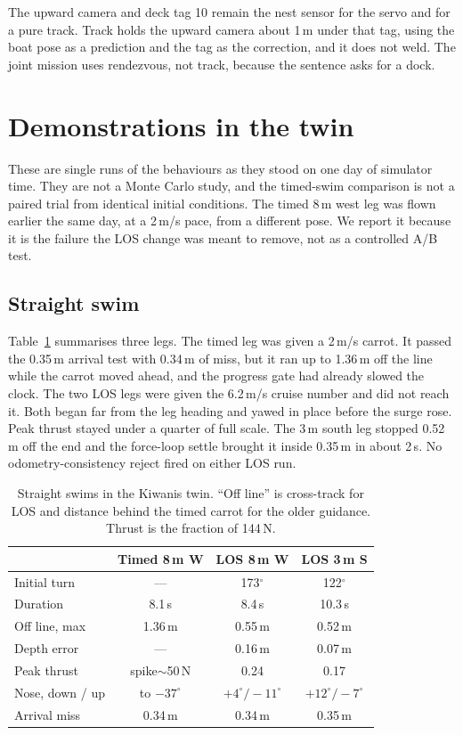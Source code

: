 \documentclass[conference]{IEEEtran}
\begin{document}
The upward camera and deck tag 10 remain the nest sensor for the servo and for a pure track. Track holds the upward camera about 1\,m under that tag, using the boat pose as a prediction and the tag as the correction, and it does not weld. The joint mission uses rendezvous, not track, because the sentence asks for a dock.

\section{Demonstrations in the twin}
\label{sec:results}

These are single runs of the behaviours as they stood on one day of simulator time. They are not a Monte Carlo study, and the timed-swim comparison is not a paired trial from identical initial conditions. The timed 8\,m west leg was flown earlier the same day, at a 2\,m/s pace, from a different pose. We report it because it is the failure the LOS change was meant to remove, not as a controlled A/B test.

\subsection{Straight swim}
Table~\ref{tab:swim} summarises three legs. The timed leg was given a 2\,m/s carrot. It passed the 0.35\,m arrival test with 0.34\,m of miss, but it ran up to 1.36\,m off the line while the carrot moved ahead, and the progress gate had already slowed the clock. The two LOS legs were given the 6.2\,m/s cruise number and did not reach it. Both began far from the leg heading and yawed in place before the surge rose. Peak thrust stayed under a quarter of full scale. The 3\,m south leg stopped 0.52\,m off the end and the force-loop settle brought it inside 0.35\,m in about 2\,s. No odometry-consistency reject fired on either LOS run.

\begin{table}[t]
\caption{Straight swims in the Kiwanis twin. ``Off line'' is cross-track for LOS and distance behind the timed carrot for the older guidance. Thrust is the fraction of 144\,N.}
\label{tab:swim}
\centering
\begin{tabular}{lccc}
\toprule
 & Timed 8\,m W & LOS 8\,m W & LOS 3\,m S \\
\midrule
Initial turn & --- & 173$^\circ$ & 122$^\circ$ \\
Duration & 8.1\,s & 8.4\,s & 10.3\,s \\
Off line, max & 1.36\,m & 0.55\,m & 0.52\,m \\
Depth error & --- & 0.16\,m & 0.07\,m \\
Peak thrust & spike$\sim$50\,N & 0.24 & 0.17 \\
Nose, down / up & to $-37^\circ$ & $+4^\circ/-11^\circ$ & $+12^\circ/-7^\circ$ \\
Arrival miss & 0.34\,m & 0.34\,m & 0.35\,m \\
\bottomrule
\end{tabular}
\end{table}
\end{document}
